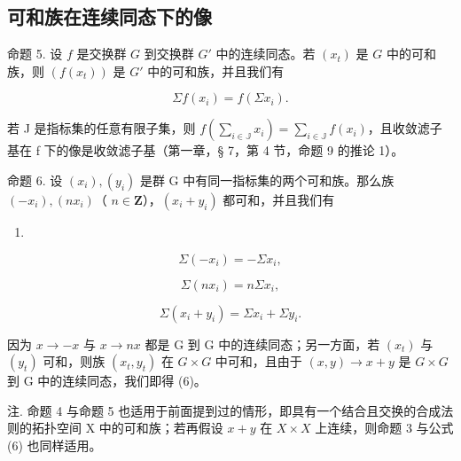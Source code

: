 \subsection{可和族在连续同态下的像}

命题 5. 设 \(f\) 是交换群 \(G\) 到交换群 \(G'\) 中的连续同态。若 \((x_t)\) 是 \(G\) 中的可和族，则 \((f(x_t))\) 是 \(G'\) 中的可和族，并且我们有

\[
\Sigma f (x _ {i}) = f (\Sigma x _ {i}).\tag{3}
\]

若 J 是指标集的任意有限子集，则 \(f\left(\sum_{i \in \mathbb{J}} x_i\right) = \sum_{i \in \mathbb{J}} f(x_i)\)，且收敛滤子基在 f 下的像是收敛滤子基（第一章，§ 7，第 4 节，命题 9 的推论 1）。

命题 6. 设 \((x_{i}), (y_{i})\) 是群 G 中有同一指标集的两个可和族。那么族 \((-x_{i}), (nx_{i})\)（ \(n \in \mathbf{Z}\)），\((x_{i} + y_{i})\) 都可和，并且我们有

\begin{enumerate}
\def\labelenumi{(\arabic{enumi})}
\setcounter{enumi}{3}
\tightlist
\item
\end{enumerate}

\[
\Sigma (- x _ {i}) = - \Sigma x _ {i},\tag{5}
\]

\[
\Sigma (n x _ {i}) = n \Sigma x _ {i},\tag{6}
\]

\[
\Sigma (x _ {i} + y _ {i}) = \Sigma x _ {i} + \Sigma y _ {i}.
\]

因为 \(x \rightarrow -x\) 与 \(x \rightarrow nx\) 都是 G 到 G 中的连续同态；另一方面，若 \((x_{t})\) 与 \((y_{t})\) 可和，则族 \((x_{t}, y_{t})\) 在 \(G \times G\) 中可和，且由于 \((x, y) \rightarrow x + y\) 是 \(G \times G\) 到 G 中的连续同态，我们即得 (6)。

注. 命题 4 与命题 5 也适用于前面提到过的情形，即具有一个结合且交换的合成法则的拓扑空间 X 中的可和族；若再假设 \(x + y\) 在 \(X \times X\) 上连续，则命题 3 与公式 (6) 也同样适用。

